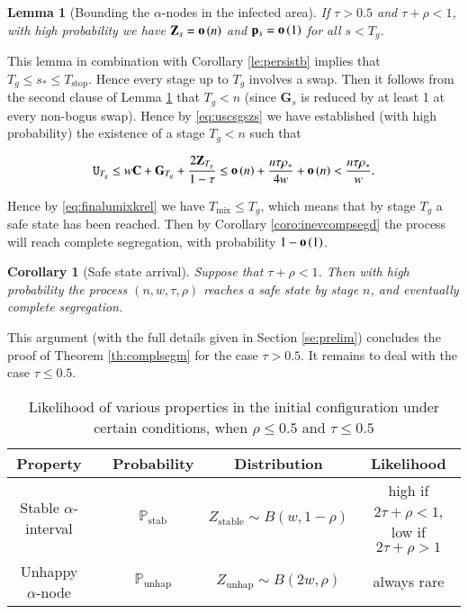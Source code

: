\documentclass[11pt]{article}
\theoremstyle{plain}
\newtheorem{lem}[thm]{Lemma}
\newtheorem{coro}[thm]{Corollary}
\numberwithin{equation}{subsection}
\newcommand{\smo}[1]{\mathop{\bf o}\/\left({#1}\right)}
\newcommand{\ZZ}{\mathbf{Z}}
\newcommand{\GG}{\mathbf{G}}
\newcommand{\CC}{\mathbf{C}}
\newcommand{\pp}{\mathbf{p}}
\newcommand{\unhap}{\mathtt{U}}
\newcommand{\Punhap}{\mathbb{P}_{\textrm{unhap}}}
\newcommand{\Pstab}{\mathbb{P}_{\textrm{stab}}}
\begin{document}
\begin{lem}[Bounding the $\alpha$-nodes in the infected area]\label{le:inthzbouwe}
If $\tau>0.5$ and $\tau+\rho<1$, 
with high probability we have $\ZZ_s=\smo{n}$ and $\pp_s=\smo{1}$ for all $s<T_g$.
\end{lem}

This lemma in combination with Corollary \ref{le:persistb} 
implies that $T_g\leq s_{\ast}\leq T_{\textrm{stop}}$.
Hence every stage up to $T_g$ involves a swap.
Then it follows from the second clause of Lemma \ref{le:inthzbouwe}  
that $T_g<n$ (since $\GG_s$ is reduced by at least 1 
at every non-bogus swap).
Hence by \eqref{eq:uscsgszs} we have established (with high probability) the existence of a stage $T_g<n$ such that

\begin{equation*}
\unhap_{T_g}\leq w\CC  + \GG_{T_g} + \frac{2\ZZ_{T_g}}{1-\tau} 
\leq \smo{n} + \frac{n\tau\rho_{\ast}}{4w}+ \smo{n} <\frac{n\tau\rho_{\ast}}{w}.
\end{equation*}

Hence  by \eqref{eq:finalumixkrel} we have $T_{\textrm{mix}}\leq T_g$,
which means that by stage $T_g$ a safe state has been reached.
Then by Corollary \ref{coro:inevcompsegd} the process will reach complete segregation, with probability
$1-\smo{1}$.

\begin{coro} [Safe state arrival]
Suppose that $\tau+\rho<1$. Then with high probability
the process $(n,w,\tau,\rho)$  reaches a safe state by stage $n$, and eventually complete segregation.
\end{coro}

This argument (with the full details given in Section \ref{se:prelim})
concludes the proof of Theorem \ref{th:complsegm} for the case $\tau>0.5$.
It remains to deal with the case $\tau\leq0.5$.






\begin{table}\caption{Likelihood of various properties 
in the initial configuration under certain conditions, when $\rho\leq 0.5$ and $\tau \leq 0.5$}
\label{ta:vlikelyghd}
\colorbox{black!10}{ 
 \begin{tabular}{ccccc}
 {\bf\small Property}&  & {\bf\small Probability} &  {\bf\small Distribution}& {\bf\small Likelihood}\\[1ex]
\toprule
{\small Stable $\alpha$-interval} &	\hspace{0.3cm} & {\small $\Pstab$} &{\small $Z_{\textrm{stable}}\sim B(w, 1-\rho)$}\hspace{0.5cm}  &
{\small high if $2\tau +\rho<1$, low if $2\tau +\rho >1$}\\[1ex]
{\small Unhappy $\alpha$-node}  & \hspace{0.3cm} & {\small $\Punhap$} &{\small $Z_{\textrm{unhap}}\sim B(2w, \rho)$}\hspace{0.5cm} &{\small always rare}\\[1ex]
\end{tabular}}
\centering
\end{table}
\end{document}
